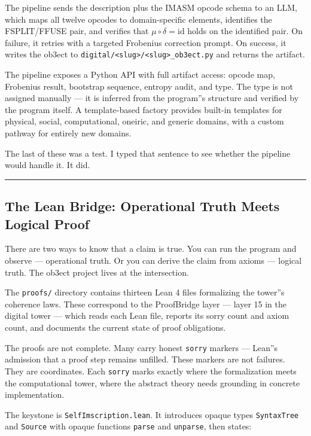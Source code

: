 \documentclass[12pt,a4paper]{article}
\begin{document}
The pipeline sends the description plus the IMASM opcode schema to an LLM, which maps all twelve opcodes to domain-specific elements, identifies the FSPLIT/FFUSE pair, and verifies that $\mu\circ\delta = \mathrm{id}$ holds on the identified pair. On failure, it retries with a targeted Frobenius correction prompt. On success, it writes the ob3ect to \texttt{digital/\textless{}slug\textgreater{}/\textless{}slug\textgreater{}\_ob3ect.py} and returns the artifact.

The pipeline exposes a Python API with full artifact access: opcode map, Frobenius result, bootstrap sequence, entropy audit, and type. The type is not assigned manually --- it is inferred from the program''s structure and verified by the program itself. A template-based factory provides built-in templates for physical, social, computational, oneiric, and generic domains, with a custom pathway for entirely new domains.

The last of these was a test. I typed that sentence to see whether the pipeline would handle it. It did.

\begin{center}
\rule{0.5\textwidth}{0.4pt}
\end{center}

\subsection{The Lean Bridge: Operational Truth Meets Logical Proof}

There are two ways to know that a claim is true. You can run the program and observe --- operational truth. Or you can derive the claim from axioms --- logical truth. The ob3ect project lives at the intersection.

The \texttt{proofs/} directory contains thirteen Lean 4 files formalizing the tower''s coherence laws. These correspond to the ProofBridge layer --- layer 15 in the digital tower --- which reads each Lean file, reports its sorry count and axiom count, and documents the current state of proof obligations.

The proofs are not complete. Many carry honest \texttt{sorry} markers --- Lean''s admission that a proof step remains unfilled. These markers are not failures. They are coordinates. Each \texttt{sorry} marks exactly where the formalization meets the computational tower, where the abstract theory needs grounding in concrete implementation.

The keystone is \texttt{SelfImscription.lean}. It introduces opaque types \texttt{SyntaxTree} and \texttt{Source} with opaque functions \texttt{parse} and \texttt{unparse}, then states:
\end{document}
